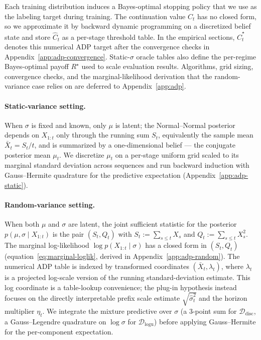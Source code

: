 \documentclass[11pt]{article}
\begin{document}
Each training distribution induces a Bayes-optimal stopping policy that we use as the labeling target during training. The continuation value $C_t$ has no closed form, so we approximate it by backward dynamic programming on a discretized belief state and store $\widehat C_t$ as a per-stage threshold table. In the empirical sections, $\widehat C_t^\star$ denotes this numerical ADP target after the convergence checks in Appendix~\ref{app:adp-convergence}. Static-$\sigma$ oracle tables also define the per-regime Bayes-optimal payoff $R^\star$ used to scale evaluation results. Algorithms, grid sizing, convergence checks, and the marginal-likelihood derivation that the random-variance case relies on are deferred to Appendix~\ref{app:adp}.

\paragraph{Static-variance setting.} When $\sigma$ is fixed and known, only $\mu$ is latent; the Normal--Normal posterior depends on $X_{1:t}$ only through the running sum $S_t$, equivalently the sample mean $\bar X_t = S_t/t$, and is summarized by a one-dimensional belief --- the conjugate posterior mean $\mu_t$. We discretize $\mu_t$ on a per-stage uniform grid scaled to its marginal standard deviation across sequences and run backward induction with Gauss--Hermite quadrature for the predictive expectation (Appendix~\ref{app:adp-static}).

\paragraph{Random-variance setting.} When both $\mu$ and $\sigma$ are latent, the joint sufficient statistic for the posterior $p(\mu, \sigma \mid X_{1:t})$ is the pair $(S_t, Q_t)$ with $S_t := \sum_{s \le t} X_s$ and $Q_t := \sum_{s \le t} X_s^2$. The marginal log-likelihood $\log p(X_{1:t} \mid \sigma)$ has a closed form in $(S_t, Q_t)$ (equation~\eqref{eq:marginal-loglik}, derived in Appendix~\ref{app:adp-random}). The numerical ADP table is indexed by transformed coordinates $(\bar X_t, \lambda_t)$, where \(\lambda_t\) is a projected log-scale version of the running standard-deviation estimate. This log coordinate is a table-lookup convenience; the plug-in hypothesis instead focuses on the directly interpretable prefix scale estimate \(\sqrt{\hat\sigma_t^2}\) and the horizon multiplier \(\eta_t\). We integrate the mixture predictive over $\sigma$ (a 3-point sum for $\mathcal{D}_{\mathrm{disc}}$, a Gauss--Legendre quadrature on $\log\sigma$ for $\mathcal{D}_{\mathrm{logu}}$) before applying Gauss--Hermite for the per-component expectation.
\end{document}
